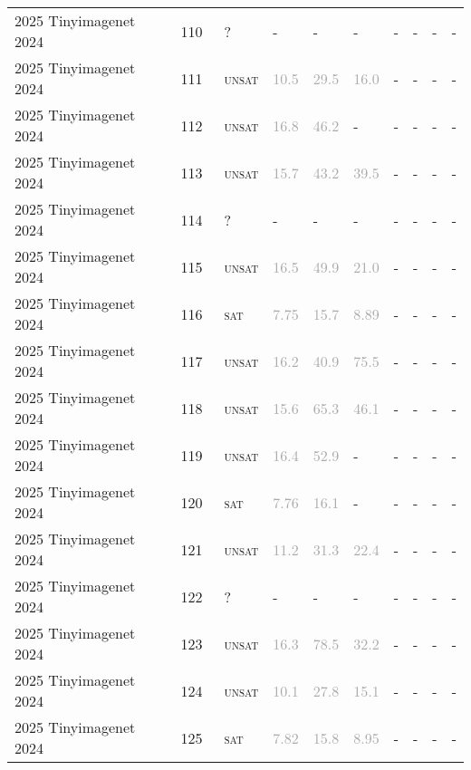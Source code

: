 \begin{center}
{\begin{longtable}{@{}llllllllll@{}}
2025 Tinyimagenet 2024 & 110 & ~? & - & - & - & - & - & - & - \\
2025 Tinyimagenet 2024 & 111 & ~\textsc{unsat} & \textcolor{darkgray}{10.5} & \textcolor{darkgray}{29.5} & \textcolor{darkgray}{16.0} & - & - & - & - \\
2025 Tinyimagenet 2024 & 112 & ~\textsc{unsat} & \textcolor{darkgray}{16.8} & \textcolor{darkgray}{46.2} & - & - & - & - & - \\
2025 Tinyimagenet 2024 & 113 & ~\textsc{unsat} & \textcolor{darkgray}{15.7} & \textcolor{darkgray}{43.2} & \textcolor{darkgray}{39.5} & - & - & - & - \\
2025 Tinyimagenet 2024 & 114 & ~? & - & - & - & - & - & - & - \\
2025 Tinyimagenet 2024 & 115 & ~\textsc{unsat} & \textcolor{darkgray}{16.5} & \textcolor{darkgray}{49.9} & \textcolor{darkgray}{21.0} & - & - & - & - \\
2025 Tinyimagenet 2024 & 116 & ~\textsc{sat} & \textcolor{darkgray}{7.75} & \textcolor{darkgray}{15.7} & \textcolor{darkgray}{8.89} & - & - & - & - \\
2025 Tinyimagenet 2024 & 117 & ~\textsc{unsat} & \textcolor{darkgray}{16.2} & \textcolor{darkgray}{40.9} & \textcolor{darkgray}{75.5} & - & - & - & - \\
2025 Tinyimagenet 2024 & 118 & ~\textsc{unsat} & \textcolor{darkgray}{15.6} & \textcolor{darkgray}{65.3} & \textcolor{darkgray}{46.1} & - & - & - & - \\
2025 Tinyimagenet 2024 & 119 & ~\textsc{unsat} & \textcolor{darkgray}{16.4} & \textcolor{darkgray}{52.9} & - & - & - & - & - \\
2025 Tinyimagenet 2024 & 120 & ~\textsc{sat} & \textcolor{darkgray}{7.76} & \textcolor{darkgray}{16.1} & - & - & - & - & - \\
2025 Tinyimagenet 2024 & 121 & ~\textsc{unsat} & \textcolor{darkgray}{11.2} & \textcolor{darkgray}{31.3} & \textcolor{darkgray}{22.4} & - & - & - & - \\
2025 Tinyimagenet 2024 & 122 & ~? & - & - & - & - & - & - & - \\
2025 Tinyimagenet 2024 & 123 & ~\textsc{unsat} & \textcolor{darkgray}{16.3} & \textcolor{darkgray}{78.5} & \textcolor{darkgray}{32.2} & - & - & - & - \\
2025 Tinyimagenet 2024 & 124 & ~\textsc{unsat} & \textcolor{darkgray}{10.1} & \textcolor{darkgray}{27.8} & \textcolor{darkgray}{15.1} & - & - & - & - \\
2025 Tinyimagenet 2024 & 125 & ~\textsc{sat} & \textcolor{darkgray}{7.82} & \textcolor{darkgray}{15.8} & \textcolor{darkgray}{8.95} & - & - & - & - \\

\end{longtable}}
\end{center}
